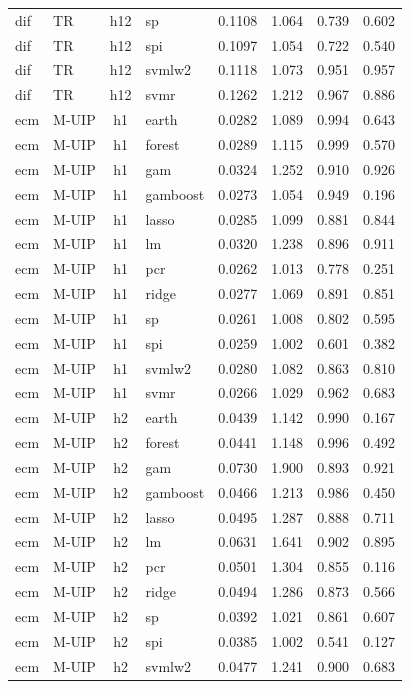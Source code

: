 \begin{ThreePartTable}
\begin{longtable}[t]{llclcccc}
dif & TR & h12 & sp & 0.1108 & 1.064 & 0.739 & 0.602\\
dif & TR & h12 & spi & 0.1097 & 1.054 & 0.722 & 0.540\\
dif & TR & h12 & svmlw2 & 0.1118 & 1.073 & 0.951 & 0.957\\
dif & TR & h12 & svmr & 0.1262 & 1.212 & 0.967 & 0.886\\
\addlinespace
ecm & M-UIP & h1 & earth & 0.0282 & 1.089 & 0.994 & 0.643\\
ecm & M-UIP & h1 & forest & 0.0289 & 1.115 & 0.999 & 0.570\\
ecm & M-UIP & h1 & gam & 0.0324 & 1.252 & 0.910 & 0.926\\
ecm & M-UIP & h1 & gamboost & 0.0273 & 1.054 & 0.949 & 0.196\\
ecm & M-UIP & h1 & lasso & 0.0285 & 1.099 & 0.881 & 0.844\\
ecm & M-UIP & h1 & lm & 0.0320 & 1.238 & 0.896 & 0.911\\
ecm & M-UIP & h1 & pcr & 0.0262 & 1.013 & 0.778 & 0.251\\
ecm & M-UIP & h1 & ridge & 0.0277 & 1.069 & 0.891 & 0.851\\
ecm & M-UIP & h1 & sp & 0.0261 & 1.008 & 0.802 & 0.595\\
ecm & M-UIP & h1 & spi & 0.0259 & 1.002 & 0.601 & 0.382\\
ecm & M-UIP & h1 & svmlw2 & 0.0280 & 1.082 & 0.863 & 0.810\\
ecm & M-UIP & h1 & svmr & 0.0266 & 1.029 & 0.962 & 0.683\\
\addlinespace
ecm & M-UIP & h2 & earth & 0.0439 & 1.142 & 0.990 & 0.167\\
ecm & M-UIP & h2 & forest & 0.0441 & 1.148 & 0.996 & 0.492\\
ecm & M-UIP & h2 & gam & 0.0730 & 1.900 & 0.893 & 0.921\\
ecm & M-UIP & h2 & gamboost & 0.0466 & 1.213 & 0.986 & 0.450\\
ecm & M-UIP & h2 & lasso & 0.0495 & 1.287 & 0.888 & 0.711\\
ecm & M-UIP & h2 & lm & 0.0631 & 1.641 & 0.902 & 0.895\\
ecm & M-UIP & h2 & pcr & 0.0501 & 1.304 & 0.855 & 0.116\\
ecm & M-UIP & h2 & ridge & 0.0494 & 1.286 & 0.873 & 0.566\\
ecm & M-UIP & h2 & sp & 0.0392 & 1.021 & 0.861 & 0.607\\
ecm & M-UIP & h2 & spi & 0.0385 & 1.002 & 0.541 & 0.127\\
ecm & M-UIP & h2 & svmlw2 & 0.0477 & 1.241 & 0.900 & 0.683\\

\end{longtable}
\end{ThreePartTable}
